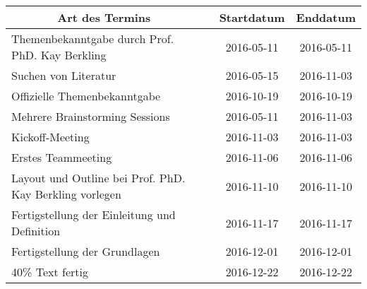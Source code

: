 
\begin{minipage}{\textwidth}
\centering
\begin{tabular}{|p{6cm}|p{3cm}|c|c|}
\hline
\multicolumn{1}{|c|}{\textbf{Art des Termins}}               & \centering{\textbf{Teilnehmer}}                                  &              \textbf{Startdatum} & \textbf{Enddatum} \\ \hline
Themenbekanntgabe durch Prof. PhD. Kay Berkling              & \centering{Kay Berkling, Marc Mahler}                            & 2016-05-11          & 2016-05-11        \\ \hline
Suchen von Literatur                                         & \centering{Marvin Zerulla}                                       & 2016-05-15          & 2016-11-03        \\ \hline
Offizielle Themenbekanntgabe                                 & \centering{Marc Mahler, Marvin Zerulla}                          & 2016-10-19          & 2016-10-19        \\ \hline
Mehrere Brainstorming  Sessions                              & \centering{Marc Mahler, Marvin Zerulla}                          & 2016-05-11          & 2016-11-03        \\ \hline
Kickoff-Meeting                                              & \centering{Marc Mahler, Marvin Zerulla, Prof. PhD. Kay Berkling} & 2016-11-03          & 2016-11-03        \\ \hline
Erstes Teammeeting                                           & \centering{Marc Mahler, Marvin Zerulla}                          & 2016-11-06          & 2016-11-06        \\ \hline
Layout und Outline bei Prof. PhD. Kay Berkling vorlegen      & \centering{Marc Mahler, Marvin Zerulla, Prof. PhD. Kay Berkling} & 2016-11-10          & 2016-11-10        \\ \hline
Fertigstellung der  Einleitung und  Definition               & \centering{Marc Mahler, Marvin Zerulla}                          & 2016-11-17          & 2016-11-17        \\ \hline
Fertigstellung der Grundlagen                                & \centering{Marc Mahler, Marvin Zerulla}                          & 2016-12-01          & 2016-12-01        \\ \hline
40\% Text fertig                                             & \centering{Marc Mahler, Marvin Zerulla}                          & 2016-12-22          & 2016-12-22        \\ \hline

\end{tabular}
\end{minipage}
